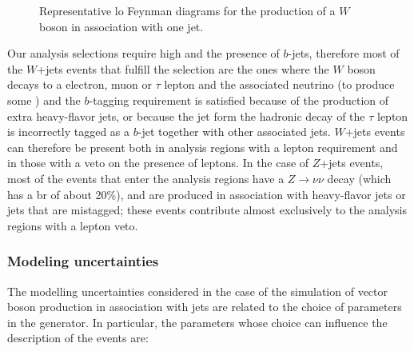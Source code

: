 \begin{figure}[h]
\centering 
{}
\caption{Representative \gls{lo} Feynman diagrams for the production of a $W$ boson in association with one jet.}\label{fig:W_prod}
\end{figure}

Our analysis selections require high \met and the presence of $b$-jets, therefore most of the $W$+jets events that fulfill the selection are the ones where the $W$ boson decays to a electron, muon or $\tau$ lepton 
and the associated neutrino (to produce some \met) and the $b$-tagging requirement is satisfied because of the production of extra heavy-flavor jets, or because the jet form the hadronic decay of the $\tau$
lepton is incorrectly tagged as a $b$-jet together with other associated jets. 
$W$+jets events can therefore be present both in analysis regions with a lepton requirement and in those with a veto on the presence of leptons. 
In the case of $Z$+jets events, most of the events that enter the analysis regions have a $Z \to \nu \nu$ decay (which has a \gls{br} of about 20\%), and are produced in association with 
heavy-flavor jets or jets that are mistagged; these events contribute almost exclusively to the analysis regions with a lepton veto. 

\subsubsection*{Modeling uncertainties}

The modelling uncertainties considered in the case of the simulation of vector boson production in association with jets are related to the choice of parameters in the \Sherpa generator. 
In particular, the parameters whose choice can influence the description of the events are:

